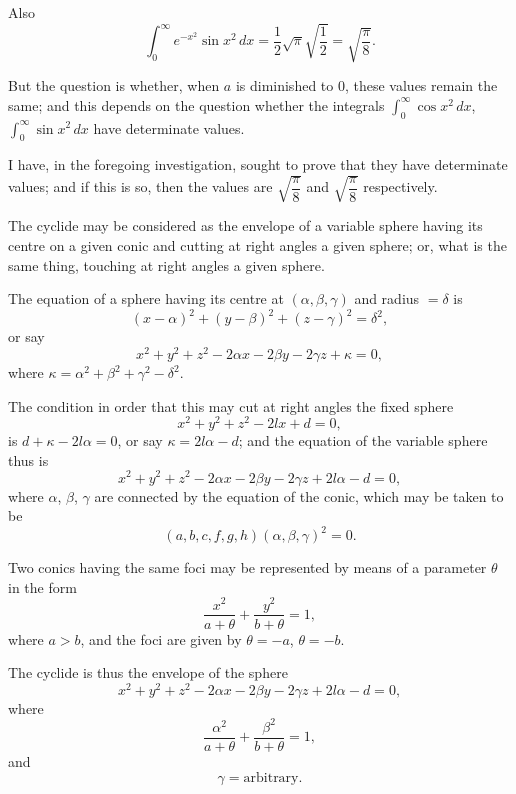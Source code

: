 \documentclass[11pt,a4paper]{book}
\begin{document}
Also
\[
\int_0^{\infty} e^{-x^2} \sin x^2\,dx = \frac{1}{2} \sqrt{\pi} \sqrt{\frac{1}{2}} = \sqrt{\frac{\pi}{8}}.
\]

But the question is whether, when $a$ is diminished to $0$, these values remain the same; and this depends on the question whether the integrals $\displaystyle\int_0^{\infty} \cos x^2\,dx$, $\displaystyle\int_0^{\infty} \sin x^2\,dx$ have determinate values.

I have, in the foregoing investigation, sought to prove that they have determinate values; and if this is so, then the values are $\sqrt{\dfrac{\pi}{8}}$ and $\sqrt{\dfrac{\pi}{8}}$ respectively.

\newpage


The cyclide may be considered as the envelope of a variable sphere having its centre on a given conic and cutting at right angles a given sphere; or, what is the same thing, touching at right angles a given sphere.

The equation of a sphere having its centre at $(\alpha, \beta, \gamma)$ and radius $= \delta$ is
\[
(x - \alpha)^2 + (y - \beta)^2 + (z - \gamma)^2 = \delta^2,
\]
or say
\[
x^2 + y^2 + z^2 - 2\alpha x - 2\beta y - 2\gamma z + \kappa = 0,
\]
where $\kappa = \alpha^2 + \beta^2 + \gamma^2 - \delta^2$.

The condition in order that this may cut at right angles the fixed sphere
\[
x^2 + y^2 + z^2 - 2lx + d = 0,
\]
is $d + \kappa - 2l\alpha = 0$, or say $\kappa = 2l\alpha - d$; and the equation of the variable sphere thus is
\[
x^2 + y^2 + z^2 - 2\alpha x - 2\beta y - 2\gamma z + 2l\alpha - d = 0,
\]
where $\alpha$, $\beta$, $\gamma$ are connected by the equation of the conic, which may be taken to be
\[
(a, b, c, f, g, h)(\alpha, \beta, \gamma)^2 = 0.
\]

\newpage

Two conics having the same foci may be represented by means of a parameter $\theta$ in the form
\[
\frac{x^2}{a + \theta} + \frac{y^2}{b + \theta} = 1,
\]
where $a > b$, and the foci are given by $\theta = -a$, $\theta = -b$.

The cyclide is thus the envelope of the sphere
\[
x^2 + y^2 + z^2 - 2\alpha x - 2\beta y - 2\gamma z + 2l\alpha - d = 0,
\]
where
\[
\frac{\alpha^2}{a + \theta} + \frac{\beta^2}{b + \theta} = 1,
\]
and
\[
\gamma = \text{arbitrary}.
\]
\end{document}
